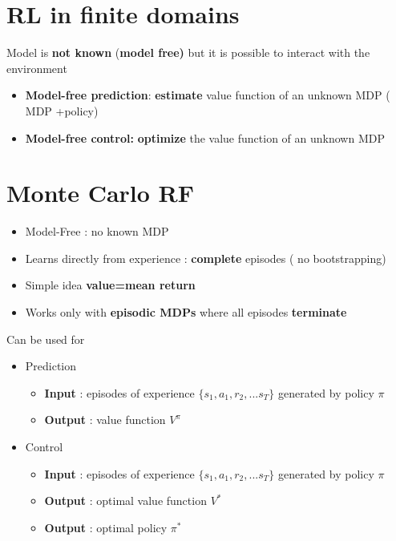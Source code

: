 \documentclass[12pt]{article} %
\begin{document}
\section{RL in finite domains}
Model is \textbf{not known} (\textbf{model free)} but it is possible to interact with the environment
\begin{itemize}
\item \textbf{Model-free prediction}: \textbf{estimate} value function of an unknown MDP ( MDP +policy)
\item \textbf{Model-free control:} \textbf{optimize} the value function of an unknown MDP
\end{itemize}

\section{Monte Carlo RF}
\begin{itemize}
\item  Model-Free : no known MDP
\item  Learns directly from experience : \textbf{complete} episodes ( no bootstrapping)
\item Simple idea \textbf{value=mean return}
\item Works only with \textbf{episodic MDPs} where all episodes \textbf{terminate}
\end{itemize}
Can be used for
\begin{itemize}
\item Prediction 
\begin{itemize}
\item \textbf{Input}  : episodes of experience $\{s_1,a_1,r_2,...s_T\}$ generated by policy $\pi$
\item \textbf{Output} : value function $V^{\pi}$
\end{itemize}
\item Control
\begin{itemize}
\item \textbf{Input}  : episodes of experience $\{s_1,a_1,r_2,...s_T\}$ generated by policy $\pi$
\item \textbf{Output} : optimal value function $V^{*}$
\item \textbf{Output} : optimal policy $\pi^*$
\end{itemize}
\end{itemize}
\end{document}
